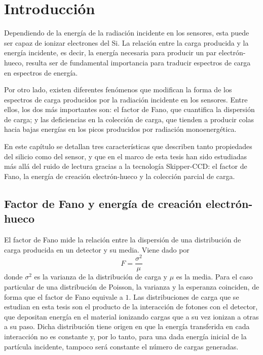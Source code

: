 \newpage
{}  %
\setcounter{page}{1}    %

\chapter{Introducción}
\noindent Dependiendo de la energía de la radiación incidente en los sensores, esta puede ser capaz de ionizar electrones del Si.  
La relación entre la carga producida y la energía incidente, es decir, la energía necesaria para producir un par electrón-hueco, resulta ser de fundamental importancia para traducir espectros de carga en espectros de energía.

Por otro lado, existen diferentes fenómenos que modifican la forma de los espectros de carga producidos por la radiación incidente en los sensores. Entre ellos, los dos más importantes son: el factor de Fano, que cuantifica la dispersión de carga; y las deficiencias en la colección de carga, que tienden a producir colas hacia bajas energías en los picos producidos por radiación monoenergética.

En este capítulo se detallan tres características que describen tanto propiedades del silicio como del sensor, y que en el marco de esta tesis han sido estudiadas más allá del ruido de lectura gracias a la tecnología Skipper-CCD: el factor de Fano, la energía de creación electrón-hueco y la colección parcial de carga.

\section{Factor de Fano y energía de creación electrón-hueco}
\noindent El factor de Fano mide la relación entre la dispersión de una distribución de carga producida en un detector y su media. Viene dado por
\begin{equation*}
    F = \frac{\sigma^{2}}{\mu}
\end{equation*}
donde $\sigma^{2}$ es la varianza de la distribución de carga y $\mu$ es la media. 
Para el caso particular de una distribución de Poisson, la varianza y la esperanza coinciden, de forma que el factor de Fano equivale a $1$. 
Las distribuciones de carga que se estudian en esta tesis son el producto de la interacción de fotones con el detector, que depositan energía en el material ionizando cargas que a su vez ionizan a otras a su paso. Dicha distribución tiene origen en que la energía transferida en cada interacción no es constante y, por lo tanto, para una dada energía inicial de la partícula incidente, tampoco será constante el número de cargas generadas.

